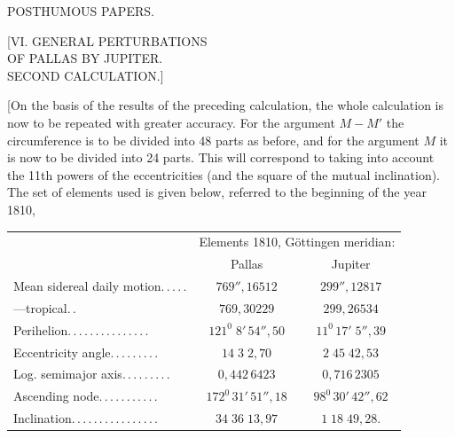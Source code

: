 \clearpage
\begin{landscape}
\begingroup
\fontsize{10}{13}\selectfont
{}
\renewcommand{\headrulewidth}{0pt}
\begin{center}
{\Large POSTHUMOUS PAPERS.}\par\bigskip
{\large [VI. GENERAL PERTURBATIONS\\OF PALLAS BY JUPITER.\\SECOND CALCULATION.]}\par\bigskip
[1.]
\end{center}
\par\noindent\hspace*{\parindent}[On the basis of the results of the preceding calculation, the whole calculation is now to be repeated with greater accuracy. For the argument \(M-M'\) the circumference is to be divided into 48 parts as before, and for the argument \(M\) it is now to be divided into 24 parts. This will correspond to taking into account the 11th powers of the eccentricities (and the square of the mutual inclination). The set of elements used is given below, referred to the beginning of the year 1810,
\begingroup
\small\setlength{\tabcolsep}{8pt}\renewcommand{\arraystretch}{1.2}
\begin{center}
\begin{tabular}{@{}lcc@{}}
&\multicolumn{2}{c}{Elements 1810, Göttingen meridian:}\\
&Pallas&Jupiter\\
Mean sidereal daily motion\enspace .\,.\,.\,.\,.&\(769''{,}16512\)&\(299''{,}12817\)\\
\hspace*{2em}---\hfill tropical\enspace .\,.&\(769{,}30229\)&\(299{,}26534\)\\
Perihelion\enspace .\,.\,.\,.\,.\,.\,.\,.\,.\,.\,.\,.\,.\,.\,.&\(121^0\;8'\,54''{,}50\)&\(11^0\,17'\;5''{,}39\)\\
Eccentricity angle\enspace .\,.\,.\,.\,.\,.\,.\,.\,.&\(14\;3\;2{,}70\)&\(2\;45\;42{,}53\)\\
Log. semimajor axis\enspace .\,.\,.\,.\,.\,.\,.\,.\,.&\(0{,}442\,6423\)&\(0{,}716\,2305\)\\
Ascending node\enspace .\,.\,.\,.\,.\,.\,.\,.\,.\,.\,.&\(172^0\,31'\,51''{,}18\)&\(98^0\,30'\,42''{,}62\)\\
Inclination\enspace .\,.\,.\,.\,.\,.\,.\,.\,.\,.\,.\,.\,.\,.\,.\,.&\(34\;36\;13{,}97\)&\(1\;18\;49{,}28.\)

\end{tabular}
\end{center}
\end{landscape}
